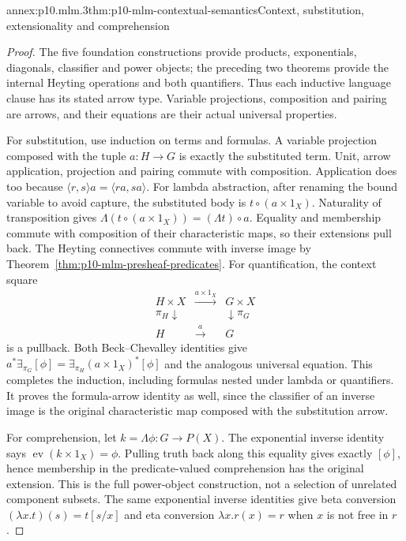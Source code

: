 \begin{annexitem}{annex:p10.mlm.3}{thm:p10-mlm-contextual-semantics}{Context, substitution, extensionality and comprehension}
\begin{proof}
The five foundation constructions provide products, exponentials, diagonals,
classifier and power objects; the preceding two theorems provide the internal
Heyting operations and both quantifiers. Thus each inductive language clause
has its stated arrow type. Variable projections, composition and pairing
are arrows, and their equations are their actual universal properties.

For substitution, use induction on terms and formulas. A variable projection
composed with the tuple \(a:H\to G\) is exactly the substituted term.
Unit, arrow application, projection and pairing commute with composition.
Application does too because
\(\langle r,s\rangle a=\langle ra,sa\rangle\).
For lambda abstraction, after renaming the bound variable to avoid capture,
the substituted body is \(t\circ(a\times1_X)\). Naturality of transposition
gives \(\Lambda(t\circ(a\times1_X))=(\Lambda t)\circ a\).
Equality and membership commute with composition of their characteristic
maps, so their extensions pull back. The Heyting connectives commute with
inverse image by Theorem~\ref{thm:p10-mlm-presheaf-predicates}.
For quantification, the context square
\[
\begin{array}{ccc}
 H\times X&\xrightarrow{a\times1_X}&G\times X\\
 \pi_H\downarrow&&\downarrow\pi_G\\
 H&\xrightarrow{a}&G
\end{array}
\]
is a pullback. Both Beck--Chevalley identities give
\(a^*\exists_{\pi_G}[\phi]=\exists_{\pi_H}(a\times1_X)^*[\phi]\)
and the analogous universal equation. This completes the induction,
including formulas nested under lambda or quantifiers. It proves the
formula-arrow identity as well, since the classifier of an inverse image is
the original characteristic map composed with the substitution arrow.

For comprehension, let \(k=\Lambda\phi:G\to P(X)\). The exponential inverse
identity says \(\operatorname{ev}(k\times1_X)=\phi\).
Pulling truth back along this equality gives exactly \([\phi]\), hence
membership in the predicate-valued comprehension has the original extension.
This is the full power-object construction, not a selection of unrelated
component subsets. The same exponential inverse identities give beta
conversion \((\lambda x.t)(s)=t[s/x]\) and eta conversion
\(\lambda x.r(x)=r\) when \(x\) is not free in \(r\).


\end{proof}
\end{annexitem}
